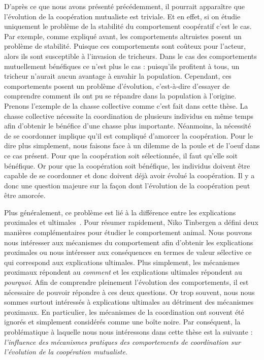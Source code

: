 		D'après ce que nous avons présenté précédemment, il pourrait apparaître que l'évolution de la coopération mutualiste est triviale. Et en effet, si on étudie uniquement le problème de la stabilité du comportement coopératif c'est le cas. Par exemple, comme expliqué avant, les comportements altruistes posent un problème de stabilité. Puisque ces comportements sont coûteux pour l'acteur, alors ils sont susceptible à l'invasion de tricheurs. Dans le cas des comportements mutuellement bénéfiques ce n'est plus le cas : puisqu'ils profitent à tous, un tricheur n'aurait aucun avantage à envahir la population. Cependant, ces comportements posent un problème d'évolution, c'est-à-dire d'essayer de comprendre comment ils ont pu se répandre dans la population à l'origine. Prenons l'exemple de la chasse collective comme c'est fait dans cette thèse. La chasse collective nécessite la coordination de plusieurs individus en même temps afin d'obtenir le bénéfice d'une chasse plus importante. Néanmoins, la nécessité de se coordonner implique qu'il est compliqué d'amorcer la coopération. Pour le dire plus simplement, nous faisons face à un dilemme de la poule et de l'oeuf dans ce cas présent. Pour que la coopération soit sélectionnée, il faut qu'elle soit bénéfique. Or pour que la coopération soit bénéfique, les individus doivent être capable de se coordonner et donc doivent déjà avoir évolué la coopération. Il y a donc une question majeure sur la façon dont l'évolution de la coopération peut être amorcée.

		Plus généralement, ce problème est lié à la différence entre les explications proximales et ultimales~\parencite{Tinbergen1963}. Pour résumer rapidement, Niko Tinbergen a défini deux manières complémentaires pour étudier le comportement animal. Nous pouvons nous intéresser aux mécanismes du comportement afin d'obtenir les explications proximales ou nous intéresser aux conséquences en termes de valeur sélective ce qui correspond aux explications ultimales. Plus simplement, les mécanismes proximaux répondent au \emph{comment} et les explications ultimales répondent au \emph{pourquoi}. Afin de comprendre pleinement l'évolution des comportements, il est nécessaire de pouvoir répondre à ces deux questions. Or trop souvent, nous nous sommes surtout intéressés à explications ultimales au détriment des mécanismes proximaux. En particulier, les mécanismes de la coordination ont souvent été ignorés et simplement considérés comme une boîte noire. Par conséquent, la problématique à laquelle nous nous intéressons dans cette thèse est la suivante :
		\emph{l'influence des mécanismes pratiques des comportements de coordination sur l'évolution de la coopération mutualiste}.


